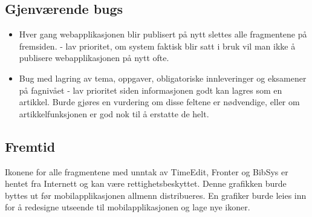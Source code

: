 \documentclass[../main.tex]{subfiles}
\begin{document}
\subsection{Gjenværende bugs}

\begin{itemize}
\item Hver gang webapplikasjonen blir publisert på nytt slettes alle fragmentene på fremsiden. - lav prioritet, om system faktisk blir satt i bruk vil man ikke å publisere webapplikasjonen på nytt ofte.
\item Bug med lagring av tema, oppgaver, obligatoriske innleveringer og eksamener på fagnivået - lav prioritet siden informasjonen godt kan lagres som en artikkel. Burde gjøres en vurdering om disse feltene er nødvendige, eller om artikkelfunksjonen er god nok til å erstatte de helt.
\end{itemize}

\subsection{Fremtid}

Ikonene for alle fragmentene med unntak av TimeEdit, Fronter og BibSys er hentet fra Internett og kan være rettighetsbeskyttet. Denne grafikken burde byttes ut før mobilapplikasjonen allmenn distribueres. En grafiker burde leies inn for å redesigne utseende til mobilapplikasjonen og lage nye ikoner.

\newpage
\end{document}
